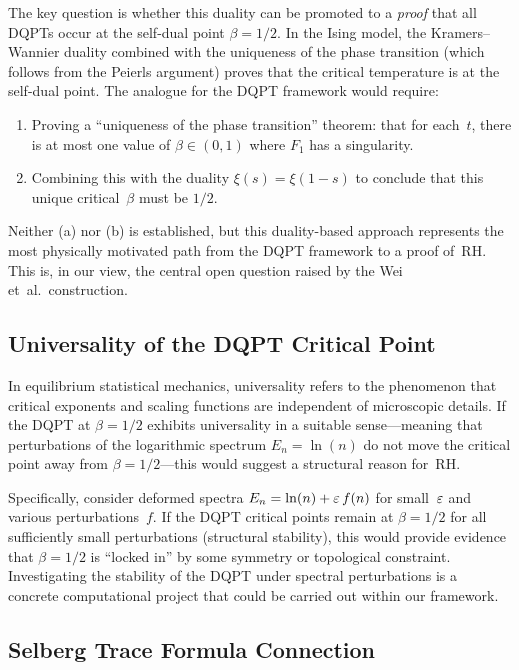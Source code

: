 The key question is whether this duality can be promoted to a \emph{proof} that all DQPTs
occur at the self-dual point $\beta = 1/2$. In the Ising model, the Kramers--Wannier
duality combined with the uniqueness of the phase transition (which follows from the
Peierls argument) proves that the critical temperature is at the self-dual point. The
analogue for the DQPT framework would require:
\begin{enumerate}
  \item[(a)] Proving a ``uniqueness of the phase transition'' theorem: that for each~$t$,
             there is at most one value of $\beta \in (0, 1)$ where $F_1$ has a
             singularity.
  \item[(b)] Combining this with the duality $\xi(s) = \xi(1 - s)$ to conclude that this
             unique critical~$\beta$ must be $1/2$.
\end{enumerate}
Neither (a) nor (b) is established, but this duality-based approach represents the most
physically motivated path from the DQPT framework to a proof of~RH. This is, in our
view, the central open question raised by the Wei et~al.\ construction.


\subsection{Universality of the DQPT Critical Point}
\label{sec:universality}

In equilibrium statistical mechanics, universality refers to the phenomenon that critical
exponents and scaling functions are independent of microscopic details. If the DQPT at
$\beta = 1/2$ exhibits universality in a suitable sense---meaning that perturbations of
the logarithmic spectrum $E_n = \ln(n)$ do not move the critical point away from
$\beta = 1/2$---this would suggest a structural reason for~RH.

Specifically, consider deformed spectra $E_n = \ln(n) + \varepsilon\,f(n)$ for small~$\varepsilon$ and
various perturbations~$f$. If the DQPT critical points remain at $\beta = 1/2$ for all
sufficiently small perturbations (structural stability), this would provide evidence that
$\beta = 1/2$ is ``locked in'' by some symmetry or topological constraint. Investigating
the stability of the DQPT under spectral perturbations is a concrete computational
project that could be carried out within our framework.


\subsection{Selberg Trace Formula Connection}
\label{sec:selberg}


